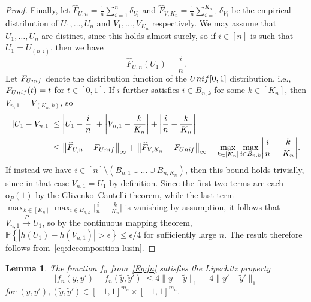 \documentclass[12pt]{article}
\newtheorem{lemma}[theorem]{Lemma}
\newcommand{\PP}[1]{\mathbb{P}\left\{{#1}\right\}}
\begin{document}
\begin{proof}
Finally, let $\widehat{F}_{U,n} = \frac{1}{n}\sum_{i=1}^n\delta_{U_i}$ and $\widehat{F}_{V,K_n} = \frac{1}{n}\sum_{i=1}^{K_n}\delta_{V_i}$ be the empirical distribution of $U_1,\ldots,U_n$ and $V_1,\ldots,V_{K_n}$ respectively. We may assume that $U_1,\dots,U_n$ are distinct, since this holds almost surely, so if $i \in [n]$ is such that $U_1 = U_{(n,i)}$, then we have 
\[
\widehat{F}_{U,n}(U_1) = \frac{i}{n}.
\]
Let $F_{\textnormal{Unif}}$ denote the distribution function of the $\textnormal{Unif}[0,1]$ distribution, i.e., $F_{\textnormal{Unif}}(t)=t$ for $t\in[0,1]$.  If $i$ further satisfies $i\in B_{n,k}$ for some $k\in [K_n]$, then $V_{n,1} = V_{(K_n,k)}$, so
\begin{align*}
|U_1 - V_{n,1}| &\leq \biggl|U_1 - \frac{i}{n}\biggr| + \biggl|V_{n,1} - \frac{k}{K_n}\biggr| + \biggl|\frac{i}{n} - \frac{k}{K_n}\biggr| \\
&\leq \bigl\|\widehat{F}_{U,n} - F_{\textnormal{Unif}}\bigr\|_\infty + \bigl\|\widehat{F}_{V,K_n} - F_{\textnormal{Unif}}\bigr\|_\infty + \max_{k\in[K_n]}\max_{i\in B_{n,k}}\biggl|\frac{i}{n} - \frac{k}{K_n}\biggr|.
\end{align*}
If instead we have $i \in[n]\setminus (B_{n,1}\cup\dots\cup B_{n,K_n})$, then this bound holds trivially, since in that case $V_{n,1} = U_1$ by definition.  Since the first two terms are each $\mathrm{o}_P(1)$ by the Glivenko--Cantelli theorem, while the last term $\max_{k\in[K_n]}\max_{i\in B_{n,k}}\biggl|\frac{i}{n} - \frac{k}{K_n}\biggr|$ is vanishing by assumption, it follows that $V_{n,1} \stackrel{P}{\to} U_1$, so by the continuous mapping theorem, $\PP{|h(U_1) - h(V_{n,1})|>\epsilon} \leq \epsilon/4$ for sufficiently large $n$.  The result therefore follows from~\eqref{eq:decomposition-lusin}.
\end{proof}
\begin{lemma}\label{lem:f_Lipschitz}
    The function $f_n$ from~\eqref{Eq:fn} satisfies the Lipschitz property
    \[
    \bigl|f_n(y,y') - f_n(\tilde{y},\tilde{y}')\bigr|\leq 4\|y-\tilde{y}\|_1 + 4\|y'-\tilde{y}'\|_1 
    \]
    for $(y,y'),(\tilde{y},\tilde{y}') \in [-1,1]^{m_n} \times [-1,1]^{m_n}$.
\end{lemma}
\end{document}
